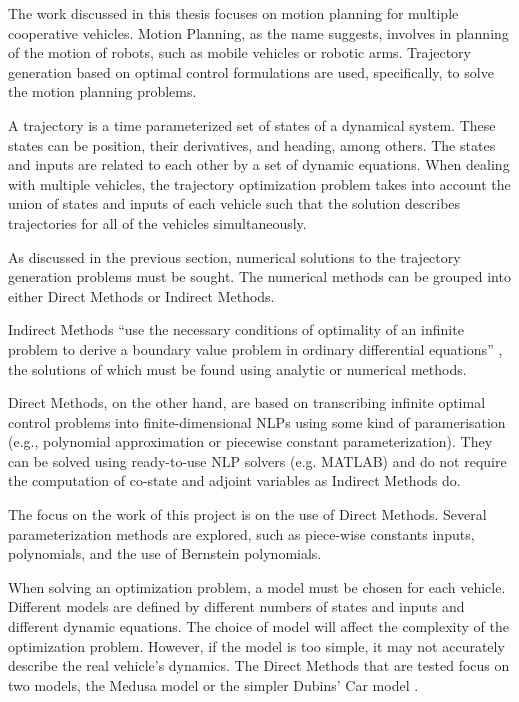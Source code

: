 \par The work discussed in this thesis focuses on motion planning for multiple cooperative vehicles. Motion Planning, as the name suggests, involves in planning of the motion of robots, such as mobile vehicles or robotic arms. Trajectory generation based on optimal control formulations are used, specifically, to solve the motion planning problems. 
\par A trajectory is a time parameterized set of states of a dynamical system. These states can be position, their derivatives, and heading, among others. The states and inputs are related to each other by a set of dynamic equations. When dealing with multiple vehicles, the trajectory optimization problem takes into account the union of states and inputs of each vehicle such that the solution describes trajectories for all of the vehicles simultaneously.
\par As discussed in the previous section, numerical solutions to the trajectory generation problems must be sought. The numerical methods can be grouped into either Direct Methods or Indirect Methods. 
\par Indirect Methods “use the necessary conditions of optimality of an infinite problem to derive a boundary value problem in ordinary differential equations” \cite{diehl2006fast}, the solutions of which must be found using analytic or numerical methods. 
\par Direct Methods, on the other hand, are based on transcribing infinite optimal control problems into finite-dimensional \acp{NLP} using some kind of paramerisation (e.g., polynomial approximation or piecewise constant parameterization). They can be solved using ready-to-use NLP solvers (e.g. MATLAB) and do not require the computation of co-state and adjoint variables as Indirect Methods do.
\par The focus on the work of this project is on the use of Direct Methods. Several parameterization methods are explored, such as piece-wise constants inputs, polynomials, and the use of Bernstein polynomials.
\par When solving an optimization problem, a model must be chosen for each vehicle. 
Different models are defined by different numbers of states and inputs and different dynamic equations. The choice of model will affect the complexity of the optimization problem. However, if the model is too simple, it may not accurately describe the real vehicle's dynamics. The Direct Methods that are tested focus on two models, the Medusa model \cite{abreu2016medusa} or the simpler Dubins' Car model \cite{Reeds1990OPTIMALPF}.


